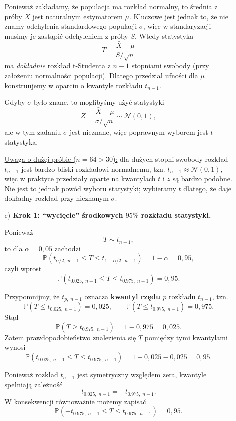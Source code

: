 \documentclass[polish, 10pt]{extarticle}
\begin{document}
\begin{enumerate}
\begin{itemize}
Ponieważ zakładamy, że populacja ma rozkład normalny, to średnia z próby $\bar X$ jest naturalnym estymatorem $\mu$.
Kluczowe jest jednak to, że nie znamy odchylenia standardowego populacji $\sigma$, więc w standaryzacji musimy je zastąpić
odchyleniem z próby $S$. Wtedy statystyka
\[
T=\frac{\bar{X}-\mu}{S/\sqrt{n}}
\]
ma \emph{dokładnie} rozkład t-Studenta z $n-1$ stopniami swobody (przy założeniu normalności populacji). Dlatego
przedział ufności dla $\mu$ konstruujemy w oparciu o kwantyle rozkładu $t_{n-1}$.

Gdyby $\sigma$ było znane, to moglibyśmy użyć statystyki
\[
Z=\frac{\bar{X}-\mu}{\sigma/\sqrt{n}}\sim\mathcal{N}(0,1),
\]
ale w tym zadaniu $\sigma$ jest nieznane, więc poprawnym wyborem jest $t$-statystyka.

\underline{Uwaga o dużej próbie ($n=64>30$):} dla dużych stopni swobody rozkład $t_{n-1}$ jest bardzo bliski rozkładowi normalnemu,
tzn. $t_{n-1}\approx\mathcal{N}(0,1)$, więc w praktyce przedziały oparte na kwantylach $t$ i $z$ są bardzo podobne.
Nie jest to jednak powód wyboru statystyki; wybieramy $t$ dlatego, że daje dokładny rozkład przy nieznanym $\sigma$. 

\item[c)] \textbf{Krok 1: ``wycięcie'' środkowych $95\%$ rozkładu statystyki.}

Ponieważ
\[
T\sim t_{n-1},
\]
to dla $\alpha=0{,}05$ zachodzi
\[
\mathbb{P}\!\left(t_{\alpha/2,\;n-1}\le T\le t_{1-\alpha/2,\;n-1}\right)=1-\alpha=0{,}95,
\]
czyli wprost
\[
\mathbb{P}\!\left(t_{0.025,\;n-1}\le T\le t_{0.975,\;n-1}\right)=0{,}95.
\]

Przypomnijmy, że $t_{p,\;n-1}$ oznacza \textbf{kwantyl rzędu $p$} rozkładu $t_{n-1}$, tzn.
\[
\mathbb{P}\!\left(T\le t_{0.025,\;n-1}\right)=0{,}025,
\qquad
\mathbb{P}\!\left(T\le t_{0.975,\;n-1}\right)=0{,}975.
\]
Stąd
\[
\mathbb{P}\!\left(T\ge t_{0.975,\;n-1}\right)=1-0{,}975=0{,}025.
\]
Zatem prawdopodobieństwo znalezienia się $T$ pomiędzy tymi kwantylami wynosi
\[
\mathbb{P}\!\left(t_{0.025,\;n-1}\le T\le t_{0.975,\;n-1}\right)
=1-0{,}025-0{,}025=0{,}95.
\]

Ponieważ rozkład $t_{n-1}$ jest symetryczny względem zera, kwantyle spełniają zależność
\[
t_{0.025,\;n-1}=-t_{0.975,\;n-1}.
\]
W konsekwencji równoważnie możemy zapisać
\[
\mathbb{P}\!\left(-t_{0.975,\;n-1}\le T\le t_{0.975,\;n-1}\right)=0{,}95.
\]


\end{itemize}
\end{enumerate}
\end{document}
